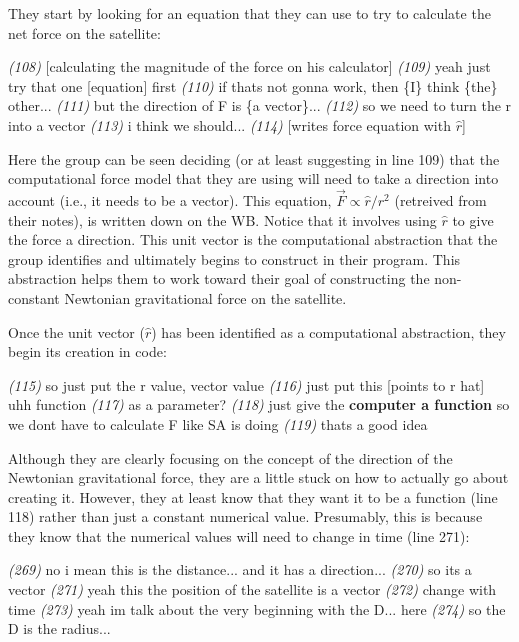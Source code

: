 \documentclass{msuphddissertation}
\begin{document}
\begin{doublespace}
They start by looking for an equation that they can use to try to calculate the net force on the satellite: \begin{description}
\SA \textit{(108)} [calculating the magnitude of the force on his calculator]
\SC \textit{(109)} yeah just try that one [equation] first		
\SC \textit{(110)} if thats not gonna work, then \{I\} think \{the\} other...		
\SD \textit{(111)} but the direction of F is \{a vector\}...	
\SD \textit{(112)} so we need to turn the r into a vector
\SC \textit{(113)} i think we should...		
\SD \textit{(114)} [writes force equation with $\hat{r}$]	
\end{description}  Here the group can be seen deciding (or at least suggesting in line 109) that the computational force model that they are using will need to take a direction into account (i.e., it needs to be a vector).  This equation, $\vec{F}\propto\hat{r}/r^{2}$ (retreived from their notes), is written down on the WB.  Notice that it involves using $\hat{r}$ to give the force a direction.  This unit vector is the computational abstraction that the group identifies and ultimately begins to construct in their program.  This abstraction helps them to work toward their goal of constructing the non-constant Newtonian gravitational force on the satellite.

Once the unit vector ($\hat{r}$) has been identified as a computational abstraction, they begin its creation in code:\begin{description}
\SD \textit{(115)} so just put the r value, vector value
\SD \textit{(116)} just put this [points to r hat] uhh function	
\SB \textit{(117)} as a parameter?			
\SD \textit{(118)} just give the \textbf{computer a function} so we dont have to calculate F {like SA is doing}	
\SB \textit{(119)} thats a good idea\end{description} Although they are clearly focusing on the concept of the direction of the Newtonian gravitational force, they are a little stuck on how to actually go about creating it.  However, they at least know that they want it to be a function (line 118) rather than just a constant numerical value.  Presumably, this is because they know that the numerical values will need to change in time (line 271):\begin{description}
\SD \textit{(269)} no i mean this is the distance... and it has a direction...	
\SB \textit{(270)} so its a vector			
\SD \textit{(271)} yeah this {the position of the satellite} is a vector	
\SD \textit{(272)} change with time	
\SC \textit{(273)} yeah im talk about the very beginning with the D... here		
\SB \textit{(274)} so the D is the radius...
\end{description}


\end{doublespace}
\end{document}
